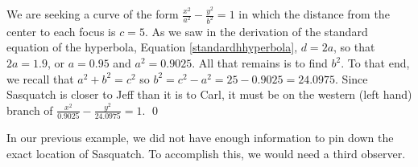 \begin{ex}
\begin{center}
\end{center}

We are seeking a curve of the form $\frac{x^2}{a^2} - \frac{y^2}{b^2} = 1$ in which the distance from the center to each focus is $c = 5$.  As we saw in the derivation of the standard equation of the hyperbola, Equation \ref{standardhhyperbola}, $d = 2a$, so that $2a = 1.9$, or $a = 0.95$ and $a^2 = 0.9025$.  All that remains is to find $b^2$.  To that end, we recall that $a^2 + b^2 = c^2$ so $b^2 = c^2 - a^2 = 25 - 0.9025 = 24.0975$. Since Sasquatch is closer to Jeff than it is to Carl, it must be on the western (left hand) branch of $\frac{x^2}{0.9025} - \frac{y^2}{24.0975} = 1$.  \qed

\end{ex}

In our previous example, we did not have enough information to pin down the exact location of Sasquatch.  To accomplish this, we would need a third observer.  

